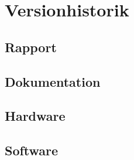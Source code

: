 \chapter{Versionhistorik}

\section{Rapport}

\section{Dokumentation}

\section{Hardware}

\section{Software}